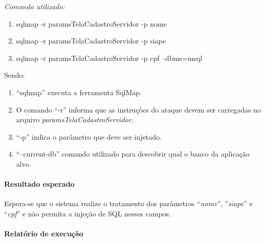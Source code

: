 \documentclass[
    12pt,               %
    openright,          %
    oneside,            %
    a4paper,            %
    section=TITLE,     %
    english,            %
    french,             %
    spanish,            %
    brazil              %
    ]{abntex2}
\begin{document}
\emph{Comando utilizado: }



\begin{enumerate}[start=1]
	
\item sqlmap -r paramsTelaCadastroServidor -p nome
	
\item sqlmap -r paramsTelaCadastroServidor -p siape
	
\item sqlmap -r paramsTelaCadastroServidor -p cpf --dbms=msql

\end{enumerate}

Sendo:



\begin{enumerate}[start=1]
	
\item \textquotedblleft{}sqlmap\textquotedblright{} executa a ferramenta SqlMap.
	
\item O comando \textquotedblleft{}-r\textquotedblright{} informa que as instruções do ataque devem ser carregadas no arquivo \emph{paramsTelaCadastroServidor}.
	
\item \textquotedblleft{}-p\textquotedblright{} indica o parâmetro que deve ser injetado.
	
\item \textquotedblleft{}--current-db\textquotedblright{} comando utilizado para descobrir qual o banco da aplicação alvo.

\end{enumerate}


\paragraph*{Resultado esperado}

Espera-se que o sistema realize o tratamento dos parâmetros \textquotedblleft{}\emph{nome}\textquotedblright{}, \textquotedblright{}\emph{siape}\textquotedblright{} e \textquotedblleft{}\emph{cpf}\textquotedblright{} e não permita a injeção de SQL nesses campos.



\paragraph*{Relatório de execução}
\end{document}
